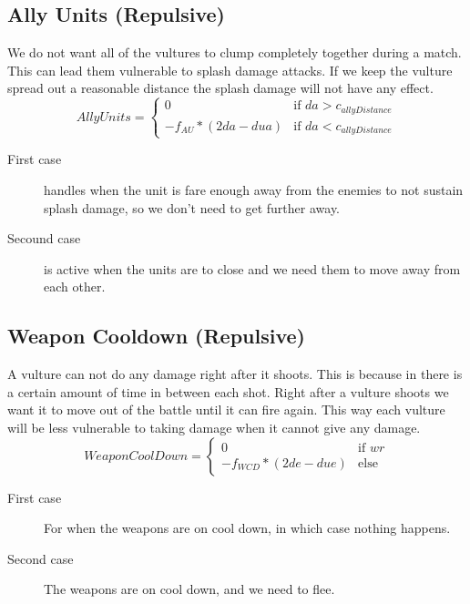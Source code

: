 	\subsection{Ally Units (Repulsive)}
We do not want all of the vultures to clump completely together during a match. This can lead them vulnerable to splash damage attacks. If we keep the vulture spread out a reasonable distance the splash damage will not have any effect.
		\begin{displaymath}
			AllyUnits = \begin{cases}
					0 & \text{if } da > c_{allyDistance}\\
					-f_{AU} * (2da - dua) & \text{if } da < c_{allyDistance}
				\end{cases}		
		\end{displaymath}
	\begin{description}	
		\item[First case] handles when the unit is fare enough away from the enemies to not sustain splash damage, so we don't need to get further away.
		\item[Secound case] is active when the units are to close and we need them to move away from each other.
	\end{description}
	\subsection{Weapon Cooldown (Repulsive)}
A vulture can not do any damage right after it shoots. This is because in there is a certain amount of time in between each shot. Right after a vulture shoots we want it to move out of the battle until it can fire again. This way each vulture will be less vulnerable to taking damage when it cannot give any damage.
		\begin{displaymath}
			WeaponCoolDown = \begin{cases}
					0 & \text{if } wr\\
					-f_{WCD} * (2de - due) & \text{else}
				\end{cases}		
		\end{displaymath}

	\begin{description}	
		\item[First case] For when the weapons are on cool down, in which case nothing happens. 
		\item[Second case] The weapons are on cool down, and we need to flee.        
    \end{description}	
